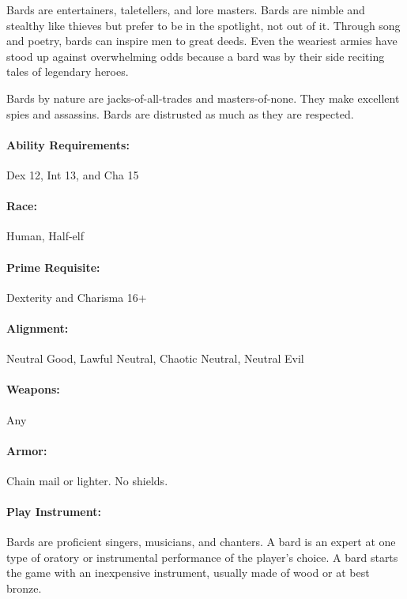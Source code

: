 \begin{multicols}{2}
Bards are entertainers, taletellers, and lore masters.  Bards are nimble and stealthy like thieves but prefer to be in the spotlight, not out of it.  Through song and poetry, bards can inspire men to great deeds.  Even the weariest armies have stood up against overwhelming odds because a bard was by their side reciting tales of legendary heroes.

Bards by nature are jacks-of-all-trades and masters-of-none.  They make excellent spies and assassins.  Bards are distrusted as much as they are respected.

\paragraph{Ability Requirements:} Dex 12, Int 13, and Cha 15

\paragraph{Race:} Human, Half-elf

\paragraph{Prime Requisite:} Dexterity and Charisma 16+

\paragraph{Alignment:} Neutral Good, Lawful Neutral, Chaotic Neutral, Neutral Evil

\paragraph{Weapons:} Any

\paragraph{Armor:} Chain mail or lighter.  No shields.

\paragraph{Play Instrument:} Bards are proficient singers, musicians, and chanters.  A bard is an expert at one type of oratory or instrumental performance of the player's choice.  A bard starts the game with an inexpensive instrument, usually made of wood or at best bronze.


\end{multicols}
